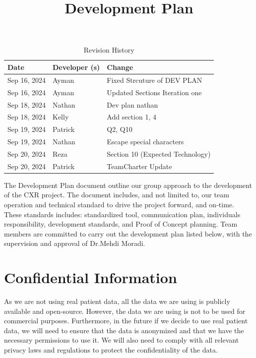 \documentclass{article}
\title{Development Plan\\\progname}
\author{\authname}
\date{}
\begin{document}
\maketitle

\begin{table}[hp]
\caption{Revision History} \label{TblRevisionHistory}
\begin{tabularx}{\textwidth}{llX}
\toprule
\textbf{Date} & \textbf{Developer (s)} & \textbf{Change}\\
\midrule
Sep 16, 2024 & Ayman & Fixed Strcuture of DEV PLAN \\
Sep 16, 2024 & Ayman & Updated Sections Iteration one\\
Sep 18, 2024 & Nathan & Dev plan nathan\\
Sep 18, 2024 & Kelly & Add section 1, 4\\
Sep 19, 2024 & Patrick & Q2, Q10 \\
Sep 19, 2024 & Nathan & Escape special characters\\
Sep 20, 2024 & Reza & Section 10 (Expected Technology)\\
Sep 20, 2024 & Patrick & TeamCharter Update\\
\bottomrule
\end{tabularx}
\end{table}

The Development Plan document outline our group approach to the development of the CXR project. The document includes, and not limited to, our team operation and technical standard to drive the project forward, and on-time. These standards includes: standardized tool, communication plan, individuals responsibility, development standards, and Proof of Concept planning. Team members are committed to carry out the development plan listed below, with the supervision and approval of Dr.Mehdi Moradi.

\newpage{}

\section{Confidential Information}

As we are not using real patient data, all the data we are using is publicly available and open-source. However, the data we are using is not to be used for commercial purposes. Furthermore, in the future if we decide to use real patient data, we will need to ensure that the data is anonymized and that we have the necessary permissions to use it. We will also need to comply with all relevant privacy laws and regulations to protect the confidentiality of the data.
\end{document}
